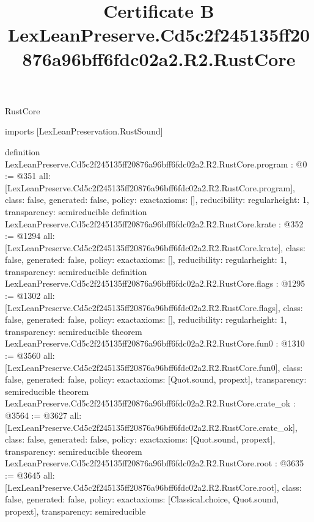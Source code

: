 \begin{lexlean}{RustCore}
\title{Certificate B LexLeanPreserve.Cd5c2f245135ff20876a96bff6fdc02a2.R2.RustCore}
\begin{coremodule}
imports [LexLeanPreservation.RustSound]

definition LexLeanPreserve.Cd5c2f245135ff20876a96bff6fdc02a2.R2.RustCore.program : @0 := @351 {
  all: [LexLeanPreserve.Cd5c2f245135ff20876a96bff6fdc02a2.R2.RustCore.program],
  class: false,
  generated: false,
  policy: exact{axioms: []},
  reducibility: regular{height: 1},
  transparency: semireducible
}
definition LexLeanPreserve.Cd5c2f245135ff20876a96bff6fdc02a2.R2.RustCore.krate : @352 := @1294 {
  all: [LexLeanPreserve.Cd5c2f245135ff20876a96bff6fdc02a2.R2.RustCore.krate],
  class: false,
  generated: false,
  policy: exact{axioms: []},
  reducibility: regular{height: 1},
  transparency: semireducible
}
definition LexLeanPreserve.Cd5c2f245135ff20876a96bff6fdc02a2.R2.RustCore.flags : @1295 := @1302 {
  all: [LexLeanPreserve.Cd5c2f245135ff20876a96bff6fdc02a2.R2.RustCore.flags],
  class: false,
  generated: false,
  policy: exact{axioms: []},
  reducibility: regular{height: 1},
  transparency: semireducible
}
theorem LexLeanPreserve.Cd5c2f245135ff20876a96bff6fdc02a2.R2.RustCore.fun0 : @1310 := @3560 {
  all: [LexLeanPreserve.Cd5c2f245135ff20876a96bff6fdc02a2.R2.RustCore.fun0],
  class: false,
  generated: false,
  policy: exact{axioms: [Quot.sound, propext]},
  transparency: semireducible
}
theorem LexLeanPreserve.Cd5c2f245135ff20876a96bff6fdc02a2.R2.RustCore.crate_ok : @3564 := @3627 {
  all: [LexLeanPreserve.Cd5c2f245135ff20876a96bff6fdc02a2.R2.RustCore.crate_ok],
  class: false,
  generated: false,
  policy: exact{axioms: [Quot.sound, propext]},
  transparency: semireducible
}
theorem LexLeanPreserve.Cd5c2f245135ff20876a96bff6fdc02a2.R2.RustCore.root : @3635 := @3645 {
  all: [LexLeanPreserve.Cd5c2f245135ff20876a96bff6fdc02a2.R2.RustCore.root],
  class: false,
  generated: false,
  policy: exact{axioms: [Classical.choice, Quot.sound, propext]},
  transparency: semireducible
}


\end{coremodule}
\end{lexlean}
